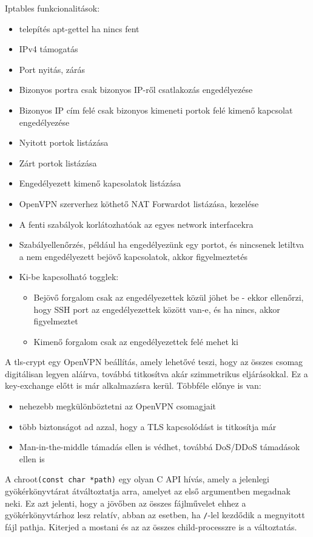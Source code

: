 Iptables funkcionalitások:
\begin{itemize}
	\item telepítés apt-gettel ha nincs fent
	\item IPv4 támogatás
	\item Port nyitás, zárás
	\item Bizonyos portra csak bizonyos IP-ről csatlakozás engedélyezése
	\item Bizonyos IP cím felé csak bizonyos kimeneti portok felé kimenő kapcsolat engedélyezése
	\item Nyitott portok listázása
	\item Zárt portok listázása
	\item Engedélyezett kimenő kapcsolatok listázása
	\item OpenVPN szerverhez köthető NAT Forwardot listázása, kezelése
	\item A fenti szabályok korlátozhatóak az egyes network interfacekra
	\item Szabályellenőrzés, például ha engedélyezünk egy portot, és nincsenek letiltva a nem engedélyezett bejövő kapcsolatok, akkor figyelmeztetés
	\item Ki-be kapcsolható togglek:
		\begin{itemize}
			\item Bejövő forgalom csak az engedélyezettek közül jöhet be - ekkor ellenőrzi, hogy SSH port az engedélyezettek között van-e, és ha nincs, akkor figyelmeztet
			\item Kimenő forgalom csak az engedélyezettek felé mehet ki
		\end{itemize}
\end{itemize}

 \label{ref:tls-crypt}
A tls-crypt egy OpenVPN beállítás, amely lehetővé teszi, hogy az összes csomag digitálisan legyen aláírva, továbbá titkosítva akár szimmetrikus eljárásokkal. Ez a key-exchange előtt is már alkalmazásra kerül. \cite{openvpnmanual}
Többféle előnye is van:
\begin{itemize}
	\item nehezebb megkülönböztetni az OpenVPN csomagjait
	\item több biztonságot ad azzal, hogy a TLS kapcsolódást is titkosítja már
	\item Man-in-the-middle támadás ellen is védhet, továbbá DoS/DDoS támadások ellen is
\end{itemize}

 \label{ref:chroot}
A chroot\texttt{(const char *path)} egy olyan C API hívás, amely a jelenlegi gyökérkönyvtárat átváltoztatja arra, amelyet az első argumentben megadnak neki. Ez azt jelenti, hogy a jövőben az összes fájlművelet ehhez a gyökérkönyvtárhoz lesz relatív, abban az esetben, ha \texttt{/}-lel kezdődik a megnyitott fájl pathja. Kiterjed a mostani és az az összes child-processzre is a változtatás. \cite{chroot}

